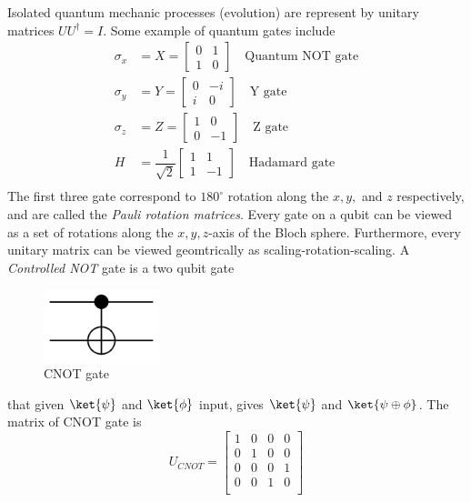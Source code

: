 Isolated quantum mechanic processes (evolution) are represent by unitary matrices \(U U^{\dagger} = I\). Some example of quantum gates include
\begin{align*} 
    \sigma_x &= X = \begin{bmatrix}
        0 & 1 \\
        1 & 0
    \end{bmatrix} \quad \text{Quantum NOT gate}\\
    \sigma_y &= Y = \begin{bmatrix}
        0 & -i \\
        i & 0
    \end{bmatrix} \quad \text{Y gate}\\
    \sigma_z &= Z = \begin{bmatrix}
        1 & 0 \\
        0 & -1
    \end{bmatrix} \quad \text{Z gate}\\
    H &= \dfrac{1}{\sqrt{2}} \begin{bmatrix}
        1 & 1 \\
        1 & -1
    \end{bmatrix} \quad \text{Hadamard gate}\\
\end{align*}
The first three gate correspond to \(180^{\circ}\) rotation along the \(x,y,\) and \(z\) respectively, and are called the \textit{Pauli rotation matrices}. Every gate on a qubit can be viewed as a set of rotations along the \(x,y,z\)-axis of the Bloch sphere. Furthermore, every unitary matrix can be viewed geomtrically as scaling-rotation-scaling. A \textit{Controlled NOT} gate is a two qubit gate 
\begin{figure}
    \centering
    \includegraphics[width = 0.3\textwidth]{Chapters/Graphics/CNOT_Gate.png}
    \caption{CNOT gate}
\end{figure}
that given \(\ket{\psi} \) and \(\ket{\phi}\) input, gives \(\ket{\psi}\) and \(\ket{\psi \oplus \phi}\). The matrix of CNOT gate is 
\begin{equation*}
    U_{CNOT}  = \begin{bmatrix}
        1 & 0 & 0 & 0 \\
        0 & 1 & 0 & 0 \\
        0 & 0 & 0 & 1 \\
        0 & 0 & 1 & 0 \\
    \end{bmatrix}
\end{equation*}

